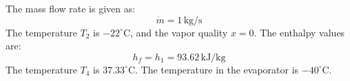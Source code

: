 The mass flow rate is given as:  
\[
\dot{m} = 1 \, \text{kg/s}
\]  
The temperature \( T_2 \) is \( -22^\circ\text{C} \), and the vapor quality \( x = 0 \).  
The enthalpy values are:  
\[
h_f = h_1 = 93.62 \, \text{kJ/kg}
\]  
The temperature \( T_4 \) is \( 37.33^\circ\text{C} \).  
The temperature in the evaporator is \( -40^\circ\text{C} \).